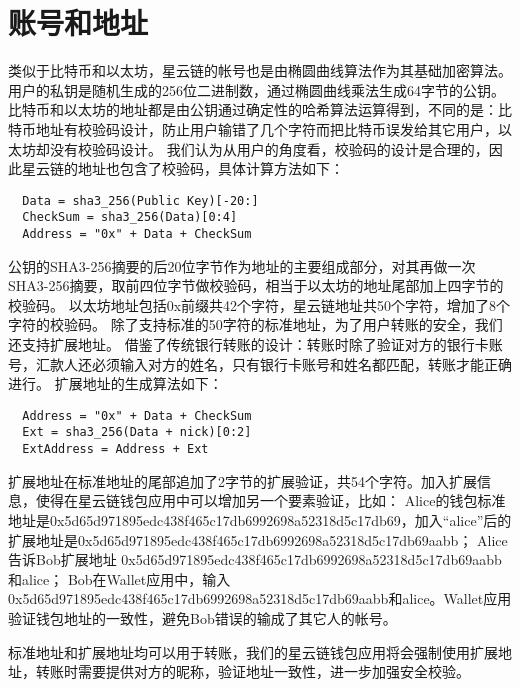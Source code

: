 \section{账号和地址}

类似于比特币和以太坊，星云链的帐号也是由椭圆曲线算法作为其基础加密算法。
用户的私钥是随机生成的256位二进制数，通过椭圆曲线乘法生成64字节的公钥。
比特币和以太坊的地址都是由公钥通过确定性的哈希算法运算得到，不同的是：比特币地址有校验码设计，防止用户输错了几个字符而把比特币误发给其它用户，以太坊却没有校验码设计。
我们认为从用户的角度看，校验码的设计是合理的，因此星云链的地址也包含了校验码，具体计算方法如下：

\begin{verbatim}
  Data = sha3_256(Public Key)[-20:]
  CheckSum = sha3_256(Data)[0:4]
  Address = "0x" + Data + CheckSum
\end{verbatim}

公钥的SHA3-256摘要的后20位字节作为地址的主要组成部分，对其再做一次SHA3-256摘要，取前四位字节做校验码，相当于以太坊的地址尾部加上四字节的校验码。
以太坊地址包括0x前缀共42个字符，星云链地址共50个字符，增加了8个字符的校验码。
	除了支持标准的50字符的标准地址，为了用户转账的安全，我们还支持扩展地址。
	借鉴了传统银行转账的设计：转账时除了验证对方的银行卡账号，汇款人还必须输入对方的姓名，只有银行卡账号和姓名都匹配，转账才能正确进行。
	扩展地址的生成算法如下：

\begin{verbatim}
  Address = "0x" + Data + CheckSum
  Ext = sha3_256(Data + nick)[0:2]
  ExtAddress = Address + Ext
\end{verbatim}

扩展地址在标准地址的尾部追加了2字节的扩展验证，共54个字符。加入扩展信息，使得在星云链钱包应用中可以增加另一个要素验证，比如：
Alice的钱包标准地址是0x5d65d971895edc438f465c17db6992698a52318d5c17db69，加入“alice”后的扩展地址是0x5d65d971895edc438f465c17db6992698a52318d5c17db69aabb；
Alice告诉Bob扩展地址 0x5d65d971895edc438f465c17db6992698a52318d5c17db69aabb和alice；
Bob在Wallet应用中，输入 0x5d65d971895edc438f465c17db6992698a52318d5c17db69aabb和alice。Wallet应用验证钱包地址的一致性，避免Bob错误的输成了其它人的帐号。
	
	标准地址和扩展地址均可以用于转账，我们的星云链钱包应用将会强制使用扩展地址，转账时需要提供对方的昵称，验证地址一致性，进一步加强安全校验。
